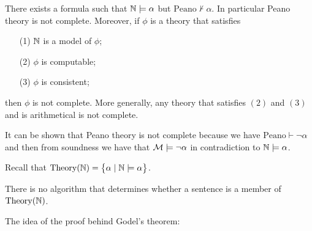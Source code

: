 \documentclass[11pt,a4paper]{article}
\begin{document}
  \begin{theorem}
    There exists a formula such that $\mathbb{N} \models \alpha$ but 
    $\mathrm{Peano} \nvdash \alpha$.
    In particular Peano theory is not complete.
    Moreover, if $\phi$ is a theory that satisfies
    \begin{enumerate}
      \item[(1)] $\mathbb{N}$ is a model of $\phi$;
      \item[(2)] $\phi$ is computable;
      \item[(3)] $\phi$ is consistent;
    \end{enumerate}
    then $\phi$ is not complete.
    More generally, any theory that satisfies $(2)$ and $(3)$ and is
    arithmetical is not complete.
  \end{theorem}
  \begin{remark}
    It can be shown that Peano theory is not complete because
    we have $\mathrm{Peano} \vdash \neg \alpha$ and then from
    soundness we have that $\mathcal{M} \models \neg \alpha$ in contradiction
    to $\mathbb{N} \models \alpha$.
  \end{remark}

  Recall that $\operatorname{Theory}(\mathbb{N}) = \set{\alpha \mid \mathbb{N}\models \alpha}$.
  \begin{proposition}
    There is no algorithm that determines whether a sentence is a member
    of $\operatorname{Theory}(\mathbb{N})$.
  \end{proposition}

  The idea of the proof behind Godel's theorem:



  
\end{document}
